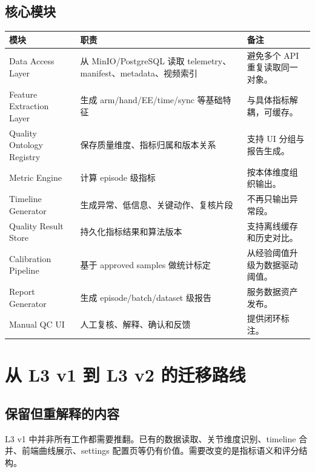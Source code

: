 \documentclass[UTF8,zihao=-4]{ctexart}
\begin{document}
\subsection{核心模块}

\begin{longtable}{L{4cm} L{5cm} L{5cm}}
\toprule
模块 & 职责 & 备注 \\
\midrule
Data Access Layer & 从 MinIO/PostgreSQL 读取 telemetry、manifest、metadata、视频索引 & 避免多个 API 重复读取同一对象。 \\
Feature Extraction Layer & 生成 arm/hand/EE/time/sync 等基础特征 & 与具体指标解耦，可缓存。 \\
Quality Ontology Registry & 保存质量维度、指标归属和版本关系 & 支持 UI 分组与报告生成。 \\
Metric Engine & 计算 episode 级指标 & 按本体维度组织输出。 \\
Timeline Generator & 生成异常、低信息、关键动作、复核片段 & 不再只输出异常段。 \\
Quality Result Store & 持久化指标结果和算法版本 & 支持离线缓存和历史对比。 \\
Calibration Pipeline & 基于 approved samples 做统计标定 & 从经验阈值升级为数据驱动阈值。 \\
Report Generator & 生成 episode/batch/dataset 级报告 & 服务数据资产发布。 \\
Manual QC UI & 人工复核、解释、确认和反馈 & 提供闭环标注。 \\
\bottomrule
\end{longtable}

\section{从 L3 v1 到 L3 v2 的迁移路线}

\subsection{保留但重解释的内容}

L3 v1 中并非所有工作都需要推翻。已有的数据读取、关节维度识别、timeline 合并、前端曲线展示、settings 配置页等仍有价值。需要改变的是指标语义和评分结构。
\end{document}
